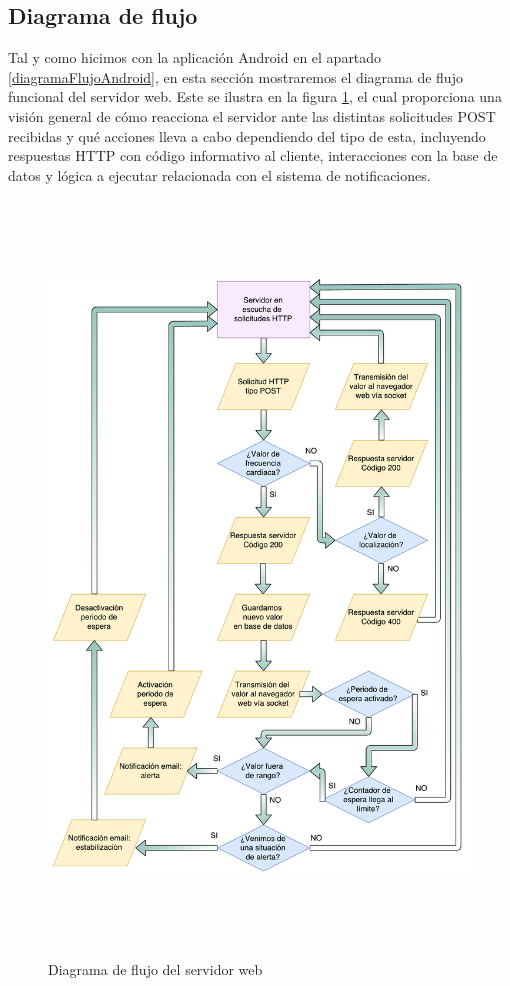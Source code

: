\subsection{Diagrama de flujo}
Tal y como hicimos con la aplicación Android en el apartado \ref{diagramaFlujoAndroid}, en esta sección mostraremos el diagrama de flujo funcional del servidor web. Este se ilustra en la figura \ref{DiagramaFlujoWeb}, el cual proporciona una visión general de cómo reacciona el servidor ante las distintas solicitudes POST recibidas y qué acciones lleva a cabo dependiendo del tipo de esta, incluyendo respuestas HTTP con código informativo al cliente, interacciones con la base de datos y lógica a ejecutar relacionada con el sistema de notificaciones.

\begin{figure}[!htbp] \centering
	\includegraphics[height=20cm]{graphs/webDiagramaFlujo.pdf} \caption{Diagrama de flujo del servidor web}
	\label{DiagramaFlujoWeb}
\end{figure}



